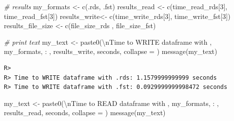 \documentclass[
  11pt,
]{book}
\newenvironment{Shaded}{\begin{snugshade}}{\end{snugshade}}
\newcommand{\AttributeTok}[1]{\textcolor[rgb]{0.61,0.61,0.61}{#1}}
\newcommand{\CommentTok}[1]{\textcolor[rgb]{0.37,0.37,0.37}{\textit{#1}}}
\newcommand{\DecValTok}[1]{\textcolor[rgb]{0.06,0.06,0.06}{#1}}
\newcommand{\FunctionTok}[1]{\textcolor[rgb]{0,0,0}{#1}}
\newcommand{\NormalTok}[1]{#1}
\newcommand{\OtherTok}[1]{\textcolor[rgb]{0.37,0.37,0.37}{#1}}
\newcommand{\SpecialCharTok}[1]{\textcolor[rgb]{0,0,0}{#1}}
\newcommand{\StringTok}[1]{\textcolor[rgb]{0.5,0.5,0.5}{#1}}
\begin{document}
\begin{Shaded}
\begin{Highlighting}[]
\CommentTok{\# results}
\NormalTok{my\_formats }\OtherTok{\textless{}{-}} \FunctionTok{c}\NormalTok{(}\StringTok{\textquotesingle{}.rds\textquotesingle{}}\NormalTok{, }\StringTok{\textquotesingle{}.fst\textquotesingle{}}\NormalTok{)}
\NormalTok{results\_read }\OtherTok{\textless{}{-}} \FunctionTok{c}\NormalTok{(time\_read\_rds[}\DecValTok{3}\NormalTok{], time\_read\_fst[}\DecValTok{3}\NormalTok{])}
\NormalTok{results\_write}\OtherTok{\textless{}{-}} \FunctionTok{c}\NormalTok{(time\_write\_rds[}\DecValTok{3}\NormalTok{], time\_write\_fst[}\DecValTok{3}\NormalTok{])}
\NormalTok{results\_file\_size }\OtherTok{\textless{}{-}} \FunctionTok{c}\NormalTok{(file\_size\_rds , file\_size\_fst)}

\CommentTok{\# print text}
\NormalTok{my\_text }\OtherTok{\textless{}{-}} \FunctionTok{paste0}\NormalTok{(}\StringTok{\textquotesingle{}}\SpecialCharTok{\textbackslash{}n}\StringTok{Time to WRITE dataframe with \textquotesingle{}}\NormalTok{,}
\NormalTok{                  my\_formats, }\StringTok{\textquotesingle{}: \textquotesingle{}}\NormalTok{,}
\NormalTok{                  results\_write, }\StringTok{\textquotesingle{} seconds\textquotesingle{}}\NormalTok{, }\AttributeTok{collapse =} \StringTok{\textquotesingle{}\textquotesingle{}}\NormalTok{)}
\FunctionTok{message}\NormalTok{(my\_text)}
\end{Highlighting}
\end{Shaded}

\begin{verbatim}
R> 
R> Time to WRITE dataframe with .rds: 1.1579999999999 seconds
R> Time to WRITE dataframe with .fst: 0.0929999999998472 seconds
\end{verbatim}

\begin{Shaded}
\begin{Highlighting}[]
\NormalTok{my\_text }\OtherTok{\textless{}{-}} \FunctionTok{paste0}\NormalTok{(}\StringTok{\textquotesingle{}}\SpecialCharTok{\textbackslash{}n}\StringTok{Time to READ dataframe with \textquotesingle{}}\NormalTok{,}
\NormalTok{                  my\_formats, }\StringTok{\textquotesingle{}: \textquotesingle{}}\NormalTok{,}
\NormalTok{                  results\_read, }\StringTok{\textquotesingle{} seconds\textquotesingle{}}\NormalTok{, }\AttributeTok{collapse =} \StringTok{\textquotesingle{}\textquotesingle{}}\NormalTok{)}
\FunctionTok{message}\NormalTok{(my\_text)}
\end{Highlighting}
\end{Shaded}
\end{document}
